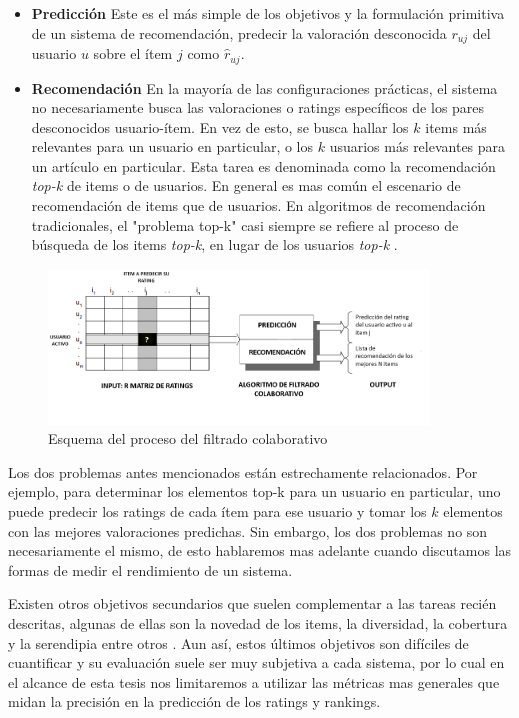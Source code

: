 \documentclass[hidelinks,12pt,a4paper]{book}
\theoremstyle{plain}
\theoremstyle{definition}
\begin{document}
\begin{itemize}
\item \textbf{Predicción} Este es el más simple de los objetivos y la formulación primitiva de un sistema de recomendación, predecir la valoración desconocida $r_{uj}$ del usuario $u$ sobre el ítem $j$ como $\hat{r}_{uj}$.

\item \textbf{Recomendación} En la mayoría de las configuraciones prácticas, el sistema no necesariamente busca las valoraciones o ratings específicos de los pares desconocidos usuario-ítem. En vez de esto, se busca	hallar los $k$ items más relevantes para un usuario en particular, o los $k$ usuarios más relevantes para un artículo en particular. Esta tarea es denominada como la recomendación \textit{top-k} de items o de usuarios. En general es mas común el escenario de recomendación de items que de usuarios. En algoritmos de recomendación tradicionales, el "problema top-k" casi siempre se refiere al proceso de búsqueda de los items \textit{top-k}, en lugar de los usuarios \textit{top-k} \cite{agg}.
\end{itemize}

\begin{figure}[htp]
\centering
\includegraphics[width=0.9\textwidth]{procesoCF.png}
\caption{Esquema del proceso del filtrado colaborativo}
\label{fig:procesoCF}
\end{figure}

Los dos problemas antes mencionados están estrechamente relacionados\cite{agg}. Por ejemplo, para determinar los elementos top-k para un usuario en particular, uno puede predecir los ratings de cada ítem para ese usuario y tomar los $k$ elementos con las mejores valoraciones predichas. Sin embargo, los dos problemas no son necesariamente el mismo, de esto hablaremos mas adelante cuando discutamos las formas de medir el rendimiento de un sistema.

Existen otros objetivos secundarios que suelen complementar a las tareas recién descritas, algunas de ellas son la novedad de los items, la diversidad, la cobertura y la serendipia entre otros \cite{evaluateshani}. Aun así, estos últimos objetivos son difíciles de cuantificar y su evaluación suele ser muy subjetiva a cada sistema, por lo cual en el alcance de esta tesis nos limitaremos a utilizar las métricas mas generales que midan la precisión en la predicción de los ratings y rankings.
\end{document}
